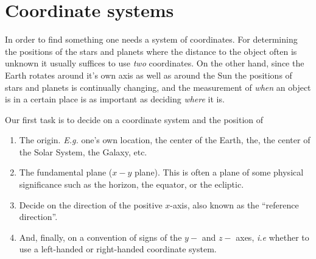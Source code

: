 

\section{Coordinate systems}

In order to find something one needs a system of coordinates. For 
determining the positions of the stars and planets where the 
distance to the object often is unknown it usually suffices to use {\it two} 
coordinates. On the other hand, since the Earth rotates around it's 
own axis as well as around the Sun the positions of stars and planets 
is continually changing, and the measurement of {\it when} an object 
is in a certain place is as important as deciding {\it where} it is. 

Our first task is to decide on a coordinate system and the position of
\begin{enumerate}
\item The origin. {\it E.g.} one's own location, the center of the Earth,
the, the center of the Solar System, the Galaxy, etc. 
\item The fundamental plane ($x-y$ plane). This is often a plane of some
physical significance such as the horizon, the equator, or the ecliptic.
\item Decide on the direction of the positive $x$-axis, also known as
the ``reference direction''. 
\item And, finally, on a convention of signs of the $y-$ and $z-$ axes, {\it i.e} whether
to use a left-handed or right-handed coordinate system.
\end{enumerate}

